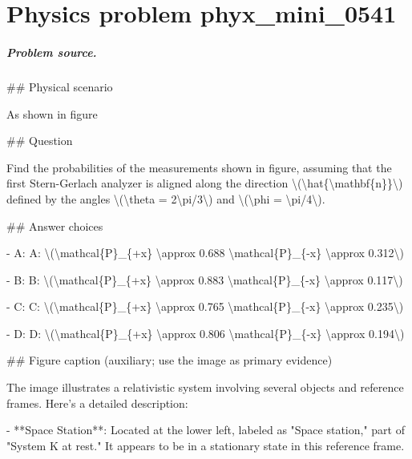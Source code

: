 
\chapter{Physics problem phyx\_mini\_0541}
\label{ch:PhyXMiniProblems_problem_phyx_mini_0541}

\paragraph{Problem source.}
\#\# Physical scenario

As shown in figure

\#\# Question

Find the probabilities of the measurements shown in figure, assuming that the first Stern-Gerlach analyzer is aligned along the direction \textbackslash{}(\textbackslash{}hat\{\textbackslash{}mathbf\{n\}\}\textbackslash{}) defined by the angles \textbackslash{}(\textbackslash{}theta = 2\textbackslash{}pi/3\textbackslash{}) and \textbackslash{}(\textbackslash{}phi = \textbackslash{}pi/4\textbackslash{}).

\#\# Answer choices

- A: A: \textbackslash{}(\textbackslash{}mathcal\{P\}\_\{+x\} \textbackslash{}approx 0.688 \textbackslash{}mathcal\{P\}\_\{-x\} \textbackslash{}approx 0.312\textbackslash{})

- B: B: \textbackslash{}(\textbackslash{}mathcal\{P\}\_\{+x\} \textbackslash{}approx 0.883 \textbackslash{}mathcal\{P\}\_\{-x\} \textbackslash{}approx 0.117\textbackslash{})

- C: C: \textbackslash{}(\textbackslash{}mathcal\{P\}\_\{+x\} \textbackslash{}approx 0.765 \textbackslash{}mathcal\{P\}\_\{-x\} \textbackslash{}approx 0.235\textbackslash{})

- D: D: \textbackslash{}(\textbackslash{}mathcal\{P\}\_\{+x\} \textbackslash{}approx 0.806 \textbackslash{}mathcal\{P\}\_\{-x\} \textbackslash{}approx 0.194\textbackslash{})

\#\# Figure caption (auxiliary; use the image as primary evidence)

The image illustrates a relativistic system involving several objects and reference frames. Here's a detailed description:

- **Space Station**: Located at the lower left, labeled as "Space station," part of "System K at rest." It appears to be in a stationary state in this reference frame.
  
